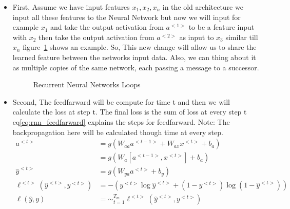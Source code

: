 \begin{itemize}
\item First, Assume we have input features $x_1, x_2, x_n$ in the old architecture we input all these features to the Neural Network but now we will input for example $x_1$ and take the output activation from $a^{<1>}$ to be a feature input with $x_2$ then take the output activation from $a^{<2>}$ as input to $x_3$ similar till $x_n$ figure~\ref{fig:RNN-rolled-loop} shows an example. So, This new change will allow us to share the learned feature between the networks input data. Also, we can thing about it as multiple copies of the same network, each passing a message to a successor\cite{colah}.


\begin{figure}[ht!]
  
  \caption{Recurrent Neural Networks Loops\cite{colah}}\label{fig:RNN-rolled-loop}
\end{figure}



\item Second, The feedfarward will be compute for time t and then we will calculate the loss at step t. The final loss is the sum of loss at every step t eq\eqref{eq:rnn_feedfarward} explains the steps for feedfarward. Note: The backpropagation here will be calculated though time at every step.
  \begin{subequations}\label{eq:rnn_feedfarward}
\begin{align}
  a^{<t>} & = g(W_{aa}a^{<t-1>}+ W_{ax}x^{<t>}+b_a)\\
   & = g(W_a[a^{<t-1>},x^{<t>}]+ b_a)\\
  \widehat{y}^{<t>} & = g(W_{ya}a^{<t>}+ b_y)
  \\ \ell^{<t>}(\widehat{y}^{<t>},y^{<t>}) & = - (y^{<t>} \log \widehat{y}^{<t>} + (1-y^{<t>}) \log (1-\widehat{y}^{<t>}))
\\ \ell(\widehat{y},y) & = \sim_{t=1}^{T_m} \ell^{<t>}(\widehat{y}^{<t>},y^{<t>})                                              
\end{align}
\end{subequations}

  
 \end{itemize}


